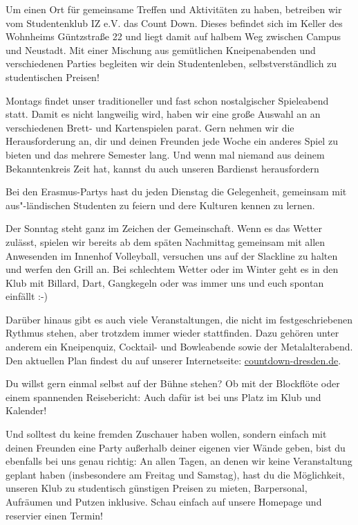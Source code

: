 

Um einen Ort für gemeinsame Treffen und Aktivitäten zu haben, betreiben wir vom Studentenklub IZ e.V. das Count Down.
Dieses befindet sich im Keller des Wohnheims Güntzstraße 22 und liegt damit auf halbem Weg zwischen Campus und Neustadt.
Mit einer Mischung aus gemütlichen Kneipenabenden und verschiedenen Parties begleiten wir dein Studentenleben, selbstverständlich zu studentischen Preisen!

Montags findet unser traditioneller und fast schon nostalgischer Spieleabend statt.
Damit es nicht langweilig wird, haben wir eine große Auswahl an an verschiedenen Brett- und Kartenspielen parat.
Gern nehmen wir die Herausforderung an, dir und deinen Freunden jede Woche ein anderes Spiel zu bieten und das mehrere Semester lang.
Und wenn mal niemand aus deinem Bekanntenkreis Zeit hat, kannst du auch unseren Bardienst herausfordern %

Bei den Erasmus-Partys hast du jeden Dienstag die Gelegenheit, gemeinsam mit aus"-ländischen Studenten zu feiern und dere Kulturen kennen zu lernen.

Der Sonntag steht ganz im Zeichen der Gemeinschaft.
Wenn es das Wetter zulässt, spielen wir bereits ab dem späten Nachmittag gemeinsam mit allen Anwesenden im Innenhof Volleyball, versuchen uns auf der Slackline zu halten und werfen den Grill an.
Bei schlechtem Wetter oder im Winter geht es in den Klub mit Billard, Dart, Gangkegeln oder was immer uns und euch spontan einfällt :-)

Darüber hinaus gibt es auch viele Veranstaltungen, die nicht im festgeschriebenen Rythmus stehen, aber trotzdem immer wieder stattfinden.
Dazu gehören unter anderem ein Kneipenquiz, Cocktail- und Bowleabende sowie der Metalalterabend.
Den aktuellen Plan findest du auf unserer Internetseite: \url{countdown-dresden.de}.

Du willst gern einmal selbst auf der Bühne stehen?
Ob mit der Blockflöte oder einem spannenden Reisebericht:
Auch dafür ist bei uns Platz im Klub und Kalender!

Und solltest du keine fremden Zuschauer haben wollen, sondern einfach mit deinen Freunden eine Party außerhalb deiner eigenen vier Wände geben, bist du ebenfalls bei uns genau richtig:
An allen Tagen, an denen wir keine Veranstaltung geplant haben (insbesondere am Freitag und Samstag), hast du die Möglichkeit, unseren Klub zu studentisch günstigen Preisen zu mieten, Barpersonal, Aufräumen und Putzen inklusive.
Schau einfach auf unsere Homepage und reservier einen Termin!

